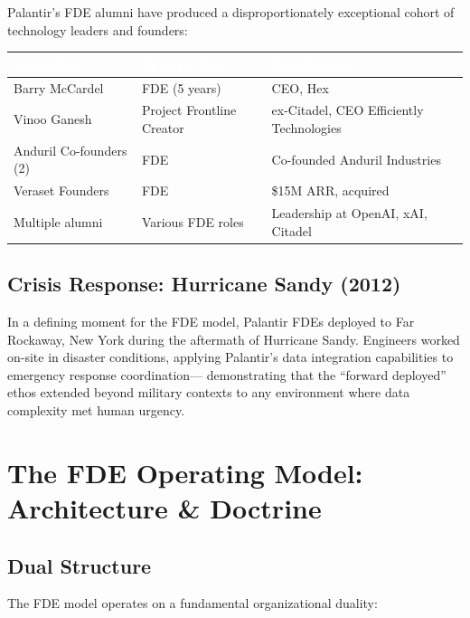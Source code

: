 Palantir's FDE alumni have produced a disproportionately exceptional
cohort of technology leaders and founders:

\begin{center}
\begin{tabular}{L{3.5cm}L{4cm}L{5.5cm}}
\toprule
{}
\textcolor{white}{\textbf{Individual}} &
\textcolor{white}{\textbf{Palantir Role}} &
\textcolor{white}{\textbf{Post-Palantir}} \\
\midrule
Barry McCardel & FDE (5 years) & CEO, Hex \\
Vinoo Ganesh & Project Frontline Creator & ex-Citadel, CEO Efficiently Technologies \\
Anduril Co-founders (2) & FDE & Co-founded Anduril Industries \\
Veraset Founders & FDE & \$15M ARR, acquired \\
Multiple alumni & Various FDE roles & Leadership at OpenAI, xAI, Citadel \\
\bottomrule
\end{tabular}
\end{center}

\subsection{Crisis Response: Hurricane Sandy (2012)}

In a defining moment for the FDE model, Palantir FDEs deployed to
Far Rockaway, New York during the aftermath of Hurricane Sandy. Engineers
worked on-site in disaster conditions, applying Palantir's data
integration capabilities to emergency response coordination---
demonstrating that the ``forward deployed'' ethos extended beyond military
contexts to any environment where data complexity met human urgency.

\section{The FDE Operating Model: Architecture \& Doctrine}

\subsection{Dual Structure}

The FDE model operates on a fundamental organizational duality:

